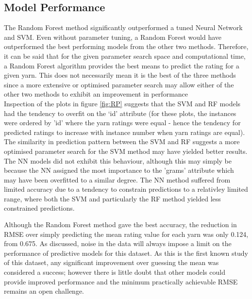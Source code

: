\documentclass[journal]{IEEEtran}
\begin{document}
\subsection{Model Performance}
The Random Forest method significantly outperformed a tuned Neural Network and SVM. Even without parameter tuning, a Random Forest would have outperformed the best performing models from the other two methods. Therefore, it can be said that for the given parameter search space and computational time, a Random Forest algorithm provides the best means to predict the rating for a given yarn. This does not necessarily mean it is the best of the three methods since a more extensive or optimised parameter search may allow either of the other two methods to exhibit an improvement in performance \cite{itsl} \\

Inspection of the plots in figure \ref{fig:RP} suggests that the SVM and RF models had the tendency to overfit on the ‘id’ attribute (for these plots, the instances were ordered by 'id' where the yarn ratings were equal - hence the tendency for predicted ratings to increase with instance number when yarn ratings are equal). The similarity in prediction pattern between the SVM and RF suggests a more optimised parameter search for the SVM method may have yielded better results. The NN models did not exhibit this behaviour, although this may simply be because the NN assigned the most importance to the 'grams' attribute which may have been overfitted to a similar degree. The NN method suffered from limited accuracy due to a tendency to constrain predictions to a relativley limited range, where both the SVM and particularly the RF method yielded less constrained predictions.

Although the Random Forest method gave the best accuracy, the reduction in RMSE over simply predicting the mean rating value for each yarn was only 0.124, from 0.675. As discussed, noise in the data will always impose a limit on the performance of predictive models for this dataset. As this is the first known study of this dataset, any significant improvement over guessing the mean was considered a success; however there is little doubt that other models could provide improved performance and the minimum practically achievable RMSE remains an open challenge.
\end{document}
